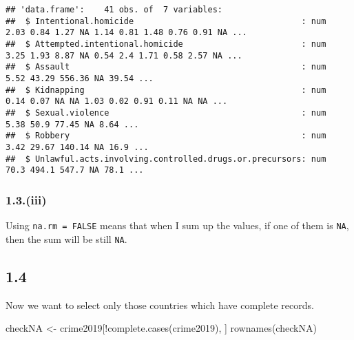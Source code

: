 \documentclass[
]{article}
\newenvironment{Shaded}{\begin{snugshade}}{\end{snugshade}}
\newcommand{\AttributeTok}[1]{\textcolor[rgb]{0.77,0.63,0.00}{#1}}
\newcommand{\ConstantTok}[1]{\textcolor[rgb]{0.00,0.00,0.00}{#1}}
\newcommand{\FunctionTok}[1]{\textcolor[rgb]{0.00,0.00,0.00}{#1}}
\newcommand{\NormalTok}[1]{#1}
\newcommand{\OtherTok}[1]{\textcolor[rgb]{0.56,0.35,0.01}{#1}}
\newcommand{\SpecialCharTok}[1]{\textcolor[rgb]{0.00,0.00,0.00}{#1}}
\begin{document}
\begin{verbatim}
## 'data.frame':    41 obs. of  7 variables:
##  $ Intentional.homicide                                  : num  2.03 0.84 1.27 NA 1.14 0.81 1.48 0.76 0.91 NA ...
##  $ Attempted.intentional.homicide                        : num  3.25 1.93 8.87 NA 0.54 2.4 1.71 0.58 2.57 NA ...
##  $ Assault                                               : num  5.52 43.29 556.36 NA 39.54 ...
##  $ Kidnapping                                            : num  0.14 0.07 NA NA 1.03 0.02 0.91 0.11 NA NA ...
##  $ Sexual.violence                                       : num  5.38 50.9 77.45 NA 8.64 ...
##  $ Robbery                                               : num  3.42 29.67 140.14 NA 16.9 ...
##  $ Unlawful.acts.involving.controlled.drugs.or.precursors: num  70.3 494.1 547.7 NA 78.1 ...
\end{verbatim}

\hypertarget{iii}{%
\subsubsection{1.3.(iii)}\label{iii}}

\begin{Shaded}
\end{Shaded}

Using \texttt{na.rm\ =\ FALSE} means that when I sum up the values, if
one of them is \texttt{NA}, then the sum will be still \texttt{NA}.

\hypertarget{section-3}{%
\subsection{1.4}\label{section-3}}

Now we want to select only those countries which have complete records.

\begin{Shaded}
\begin{Highlighting}[]
\NormalTok{checkNA }\OtherTok{\textless{}{-}}\NormalTok{ crime2019[}\SpecialCharTok{!}\FunctionTok{complete.cases}\NormalTok{(crime2019), ]}
\FunctionTok{rownames}\NormalTok{(checkNA)}
\end{Highlighting}
\end{Shaded}
\end{document}
